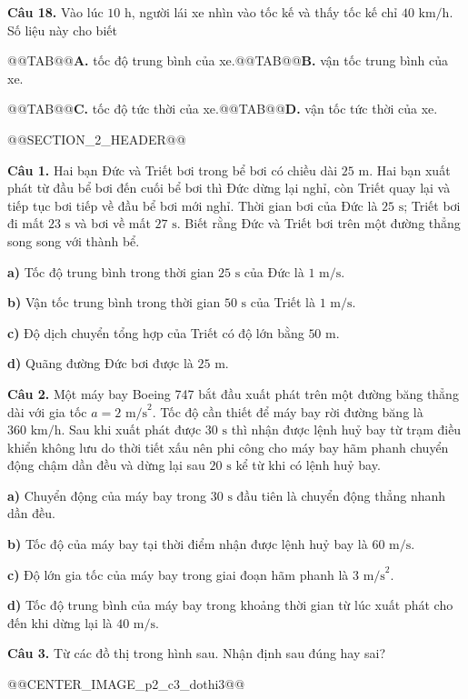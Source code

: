 \documentclass[11pt,a4paper]{article}
\begin{document}
\textbf{Câu 18.} Vào lúc $10\text{ h}$, người lái xe nhìn vào tốc kế và thấy tốc kế chỉ $40\text{ km/h}$. Số liệu này cho biết

@@TAB@@\textbf{A.} tốc độ trung bình của xe.@@TAB@@\textbf{B.} vận tốc trung bình của xe.

@@TAB@@\textbf{C.} tốc độ tức thời của xe.@@TAB@@\textbf{D.} vận tốc tức thời của xe.

@@SECTION_2_HEADER@@

\textbf{Câu 1.} Hai bạn Đức và Triết bơi trong bể bơi có chiều dài $25\text{ m}$. Hai bạn xuất phát từ đầu bể bơi đến cuối bể bơi thì Đức dừng lại nghỉ, còn Triết quay lại và tiếp tục bơi tiếp về đầu bể bơi mới nghỉ. Thời gian bơi của Đức là $25\text{ s}$; Triết bơi đi mất $23\text{ s}$ và bơi về mất $27\text{ s}$. Biết rằng Đức và Triết bơi trên một đường thẳng song song với thành bể.

\textbf{a)} Tốc độ trung bình trong thời gian $25\text{ s}$ của Đức là $1\text{ m/s}$.

\textbf{b)} Vận tốc trung bình trong thời gian $50\text{ s}$ của Triết là $1\text{ m/s}$.

\textbf{c)} Độ dịch chuyển tổng hợp của Triết có độ lớn bằng $50\text{ m}$.

\textbf{d)} Quãng đường Đức bơi được là $25\text{ m}$.

\textbf{Câu 2.} Một máy bay Boeing 747 bắt đầu xuất phát trên một đường băng thẳng dài với gia tốc $a = 2\text{ m/s}^2$. Tốc độ cần thiết để máy bay rời đường băng là $360\text{ km/h}$. Sau khi xuất phát được $30\text{ s}$ thì nhận được lệnh huỷ bay từ trạm điều khiển không lưu do thời tiết xấu nên phi công cho máy bay hãm phanh chuyển động chậm dần đều và dừng lại sau $20\text{ s}$ kể từ khi có lệnh huỷ bay.

\textbf{a)} Chuyển động của máy bay trong $30\text{ s}$ đầu tiên là chuyển động thẳng nhanh dần đều.

\textbf{b)} Tốc độ của máy bay tại thời điểm nhận được lệnh huỷ bay là $60\text{ m/s}$.

\textbf{c)} Độ lớn gia tốc của máy bay trong giai đoạn hãm phanh là $3\text{ m/s}^2$.

\textbf{d)} Tốc độ trung bình của máy bay trong khoảng thời gian từ lúc xuất phát cho đến khi dừng lại là $40\text{ m/s}$.

\textbf{Câu 3.} Từ các đồ thị trong hình sau. Nhận định sau đúng hay sai?

@@CENTER_IMAGE_p2_c3_dothi3@@
\end{document}
